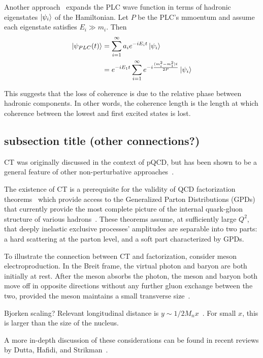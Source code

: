 Another approach~\cite{Jennings_1990, Jennings_1991, Jennings_1992}
expands the PLC wave function in terms of hadronic eigenstates
$\ket{\psi_i}$ of the Hamiltonian.
Let $P$ be the PLC's mmoentum and assume each eigenstate satisfies
$E_i \gg m_i$.
Then
\begin{align}
    \ket{\psi_{PLC}(t)} &= \sum_{i=1}^{\infty} a_i e^{-iE_it}\ket{\psi_i} \\
                        &= e^{-iE_1t} \sum_{i=1}^{\infty} e^{-i\frac{(m_i^2-m_1^2)t}{2P}} \ket{\psi_i}
\end{align}

This suggests that the loss of coherence is due to the relative phase between
hadronic components.
In other words, the coherence length is the length at which coherence between
the lowest and first excited states is lost.


\subsection{subsection title (other connections?)}
CT was originally discussed in the context of pQCD, but has been shown to be
a general feature of other non-perturbative approaches~\cite{Frankfurt_1992}.


The existence of CT is a prerequisite for the validity of QCD factorization
theorems~\cite{Brodsky_1994, Collins_1997, Frankfurt_1999, Diehl_1998,
Strikman_2000} which provide access to the Generalized Parton Distributions
(GPDs) that currently provide the most complete picture of the internal
quark-gluon structure of various hadrons~\cite{Ji_1997_Jan, Ji_1997_Jun,
Radyushkin_1996, Radyushkin_1997}.
These theorems assume, at sufficiently large $Q^2$, that deeply inelastic
exclusive processes' amplitudes are separable into two parts: a hard scattering
at the parton level, and a soft part characterized by GPDs.




To illustrate the connection between CT and factorization, consider
meson electroproduction.
In the Breit frame, the virtual photon and baryon are both initially at rest.
After the meson absorbs the photon, the meson and baryon both move off in
opposite directions without any further gluon exchange between the two,
provided the meson maintains a small transverse size~\cite{Strikman_2000}.


Bjorken scaling?
Relevant longitudinal distance is $y\sim 1 / 2 M_n x$~\cite{Frankfurt_1998}.
For small $x$, this is larger than the size of the nucleus.


A more in-depth discussion of these considerations can be found in recent
reviews by Dutta, Hafidi, and Strikman~\cite{Dutta_2013,Dutta_2012}.
